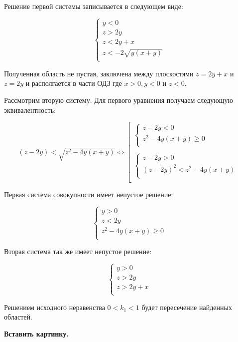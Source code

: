 Решение первой системы записывается в следующем виде:

$$
\left\{
\begin{array}{l}
y<0\\
z>2y\\
z<2y+x\\
z<-2\sqrt{y(x+y)}\\
\end{array}
\right.
$$

Полученная область не пустая, заключена между плоскостями $z=2y+x$ и $z=2y$ и располгается в части ОДЗ где $x>0, y<0$ и $z<0$.

Рассмотрим вторую систему. Для первого уравнения получаем следующую эквивалентность:

$$
(z-2y)<\sqrt{z^2-4y(x+y)}\Leftrightarrow
\left[
\begin{array}{l}
    \left\{
        \begin{array}{l}
        z-2y<0\\
        z^2-4y(x+y)\geq0\\
        \end{array}
    \right.\\
    \\
    \left\{
        \begin{array}{l}
        z-2y>0\\
        (z-2y)^2<z^2-4y(x+y)\\
        \end{array}
    \right.\\
\end{array}
\right.
$$

Первая система совокупности имеет непустое решение:

$$
\left\{
\begin{array}{l}
 y>0\\
 z<2y\\
 z^2-4y(x+y)\geq0\\
\end{array}
\right.
$$

Вторая система так же имеет непустое решение:

$$
\left\{
\begin{array}{l}
y>0\\
z>2y\\
z>2y+x\\
\end{array}
\right.
$$

Решением исходного неравенства $0<k_1<1$ будет пересечение найденных областей.

\textbf{Вставить картинку.}


